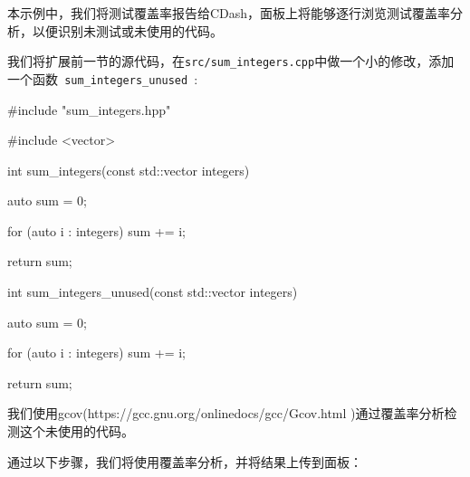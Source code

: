 本示例中，我们将测试覆盖率报告给CDash，面板上将能够逐行浏览测试覆盖率分析，以便识别未测试或未使用的代码。


我们将扩展前一节的源代码，在\texttt{src/sum\_integers.cpp}中做一个小的修改，添加一个函数\texttt{ sum\_integers\_unused }:

\begin{codebox}[cpp]
#include "sum_integers.hpp"

#include <vector>

int sum_integers(const std::vector integers) {
  auto sum = 0;
  
  for (auto i : integers) {
    sum += i;
  }
  
  return sum;
}

int sum_integers_unused(const std::vector integers) {
  auto sum = 0;
  
  for (auto i : integers) {
    sum += i;
  }
  
  return sum;
}
\end{codebox}

我们使用gcov(https://gcc.gnu.org/onlinedocs/gcc/Gcov.html )通过覆盖率分析检测这个未使用的代码。


通过以下步骤，我们将使用覆盖率分析，并将结果上传到面板：

